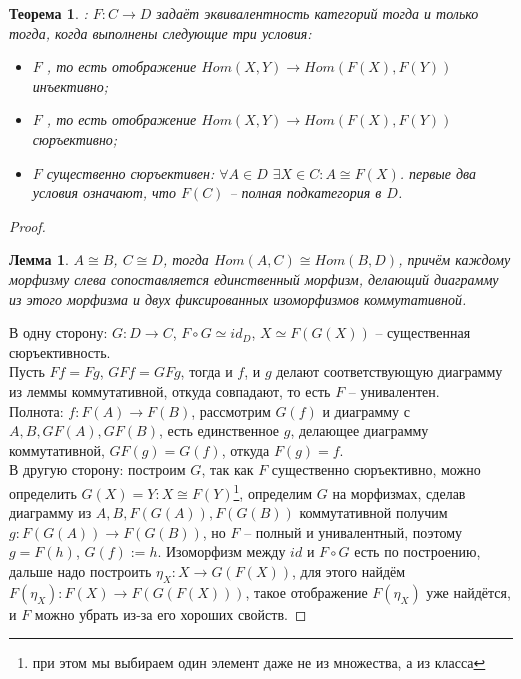 \documentclass[a4paper]{article}
\theoremstyle{indented}
\newtheorem{theorem}{Теорема}
\newtheorem{lemma}{Лемма}
\theoremstyle{definition}
\theoremstyle{remark}
\begin{document}
\begin{theorem} : 
$F: C\rightarrow D$ задаёт эквивалентность категорий тогда и только тогда, когда выполнены следующие три условия:\begin{itemize}
\item $F$ , то есть отображение $Hom(X, Y) \rightarrow Hom(F(X), F(Y))$ инъективно;
\item $F$ , то есть отображение $Hom(X, Y) \rightarrow Hom(F(X), F(Y))$ сюръективно;
\item $F$ существенно сюръективен: $\forall A \in D$ $\exists X \in C: A \cong F(X)$.
\remark первые два условия означают, что $F(C)$ -- полная подкатегория в $D$.
\end{itemize}
\end{theorem}
\begin{proof}
\begin{lemma}
$A \cong B$, $C \cong D$, тогда $Hom(A, C) \cong Hom (B, D)$, причём каждому морфизму слева сопоставляется единственный морфизм, делающий  диаграмму из этого морфизма и двух фиксированных изоморфизмов коммутативной.
\end{lemma}
В одну сторону: $G: D \rightarrow C$, $F \circ G \simeq id_D$, $X \simeq F(G(X))$ -- существенная сюръективность.
\\Пусть $Ff = Fg$, $GFf = GFg$, тогда и $f$, и $g$ делают соответствующую диаграмму из леммы коммутативной, откуда совпадают, то есть $F$ -- унивалентен.
\\Полнота: $f: F(A) \rightarrow F(B)$, рассмотрим $G(f)$ и диаграмму с $A, B, GF(A), GF(B)$, есть единственное $g$, делающее диаграмму коммутативной, $GF(g) = G(f)$, откуда $F(g) = f$.
\\В другую сторону: построим $G$, так как $F$ существенно сюръективно, можно определить $G(X) = Y: X \cong F(Y)$\footnote{при этом мы выбираем один элемент даже не из множества, а из класса}, определим $G$ на морфизмах, сделав диаграмму из $A, B, F(G(A)), F(G(B))$ коммутативной получим $g: F(G(A)) \rightarrow F(G(B))$, но $F$ -- полный и унивалентный, поэтому $g = F(h)$, $G(f) := h$. Изоморфизм между $id$ и $F \circ G$ есть по построению, дальше надо построить $\eta_X: X \rightarrow G(F(X))$, для этого найдём $F(\eta_X): F(X) \rightarrow F(G(F(X)))$, такое отображение $F(\eta_X)$ уже найдётся, и $F$ можно убрать из-за его хороших свойств. 
\end{proof}
\end{document}
